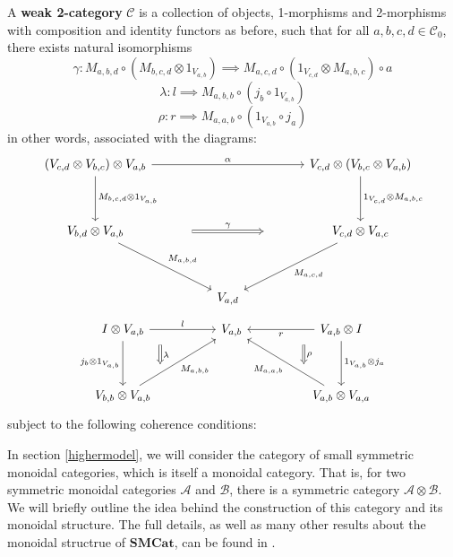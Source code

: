 \begin{defn}
  A \textbf{weak 2-category} $\mathcal{C}$ is a collection of objects, 1-morphisms and 2-morphisms with composition and identity functors as before, such that for all $a, b, c, d \in \mathcal{C}_0$, there exists natural isomorphisms
  \[
    \gamma :  M_{a,b,d} \circ (M_{b,c,d} \otimes 1_{V_{a,b}}) \implies M_{a, c, d} \circ (1_{V_{c, d}} \otimes M_{a, b, c}) \circ a
  \]
  \[
    \lambda : l \implies M_{a, b, b} \circ (j_b \circ 1_{V_{a,b}})
  \]
  \[
    \rho : r \implies M_{a, a, b} \circ (1_{V_{a,b}} \circ j_a)
  \]
  in other words, associated with the diagrams:
  \[
    \ti
    (V_{c, d} \otimes V_{b, c}) \otimes V_{a, b} \ar[d, "{M_{b, c, d} \otimes 1_{V_{a,b}}}"] \ar[rr, "\alpha"] & & V_{c, d} \otimes (V_{b, c} \otimes V_{a, b}) \ar[d, "{1_{V_{c,d}} \otimes M_{a, b, c}}"]\\
    V_{b, d} \otimes V_{a, b} \ar[rd, "M_{a, b, d}"] \ar[rr, "\gamma", Rightarrow, shorten <=50pt,shorten >=50pt]& & V_{c, d} \otimes V_{a, c} \ar[ld, "M_{a, c, d}"]\\
    & V_{a, d}      &
    \kz
  \]
  \[
    \ti
    I \otimes V_{a, b} \ar[d, "j_b \otimes 1_{V_{a, b}}", swap] \ar[d, "\lambda", Rightarrow, xshift=30pt, shorten <=10pt,shorten >=10pt, yshift=7pt] \ar[r, "l"] & V_{a, b} & V_{a, b} \otimes I \ar[l, "r"] \ar[d, "1_{V_{a, b}} \otimes j_a"] \ar[d, "\rho", Rightarrow, xshift=-30pt, shorten <=10pt,shorten >=10pt, yshift=7pt] \\
    V_{b, b} \otimes V_{a, b} \ar[ru, "M_{a, b, b}",swap] & & V_{a, b} \otimes V_{a, a} \ar[lu, "M_{a, a, b}"]
    \kz
  \]
  subject to the following coherence conditions:
  \todo{}
\end{defn}
In section \ref{highermodel}, we will consider the category of small symmetric monoidal categories, which is itself a monoidal category. That is, for two symmetric monoidal categories $\mathcal{A}$ and $\mathcal{B}$, there is a symmetric category $\mathcal{A} \otimes \mathcal{B}$. We will briefly outline the idea behind the construction of this category and its monoidal structure. The full details, as well as many other results about the monoidal structrue of $\mathbf{SMCat}$, can be found in \cite{smcat}.\\
